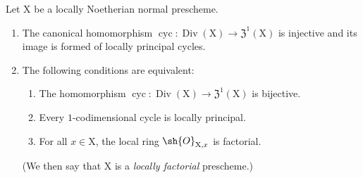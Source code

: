 \begin{theorem}[21.6.9]
\label{IV.21.6.9}
Let $\mathrm{X}$ be a locally Noetherian normal prescheme.
\begin{enumerate}[label=(\roman*)]
  \item The canonical homomorphism $\operatorname{cyc}:\operatorname{Div}(\mathrm{X})\to\mathfrak{Z}^1(\mathrm{X})$ is injective and its image is formed of locally principal cycles.
  \item The following conditions are equivalent:
  \begin{enumerate}[label=\emph{\alph*)}]
    \item The homomorphism $\operatorname{cyc}:\operatorname{Div}(\mathrm{X})\to\mathfrak{Z}^1(\mathrm{X})$ is bijective.
    \item Every $1$-codimensional cycle is locally principal.
    \item For all $x\in\mathrm{X}$, the local ring $\sh{O}_{\mathrm{X},x}$ is factorial.
  \end{enumerate}
  (We then say that $\mathrm{X}$ is a \emph{locally factorial} prescheme.)
\end{enumerate}
\end{theorem}

